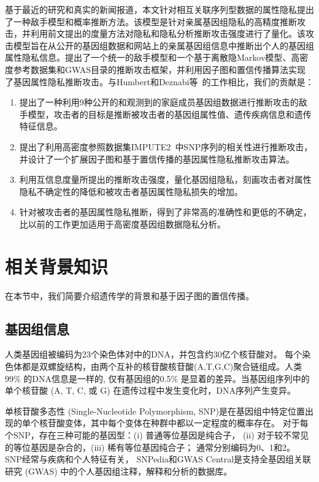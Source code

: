 基于最近的研究和真实的新闻报道，本文针对相互关联序列型数据的属性隐私提出了一种敌手模型和概率推断方法。该模型是针对亲属基因组隐私的高精度推断攻击，并利用前文提出的度量方法对隐私和隐私分析推断攻击强度进行了量化。该攻击模型旨在从公开的基因组数据和网站上的亲属基因组信息中推断出个人的基因组属性隐私信息。提出了一个统一的敌手模型和一个基于离散隐Markov模型、高密度参考数据集和GWAS目录的推断攻击框架，并利用因子图和置信传播算法实现了基因属性隐私推断攻击。与Humbert和Deznabi等~\cite{deznabi2018inference}的工作相比，我们的贡献是：

\begin{enumerate}
	\item 提出了一种利用9种公开的和观测到的家庭成员基因组数据进行推断攻击的敌手模型，攻击者的目标是推断被攻击者的基因组属性值、遗传疾病信息和遗传特征信息。
	\item 提出了利用高密度参照数据集IMPUTE2~\cite{howie2014impute2}中SNP序列的相关性进行推断攻击，并设计了一个扩展因子图和基于置信传播的基因属性隐私推断攻击算法。
	\item 利用互信息度量所提出的推断攻击强度，量化基因组隐私，刻画攻击者对属性隐私不确定性的降低和被攻击者基因属性隐私损失的增加。
	\item 针对被攻击者的基因属性隐私推断，得到了非常高的准确性和更低的不确定，比以前的工作更加适用于高密度基因组数据隐私分析。
\end{enumerate}

\section{相关背景知识}
\label{sec:backgrounds}
在本节中，我们简要介绍遗传学的背景和基于因子图的置信传播。

\subsection{基因组信息}

人类基因组被编码为23个染色体对中的DNA，并包含约30亿个核苷酸对。 每个染色体都是双螺旋结构，由两个互补的核苷酸核苷酸(A,T,G,C)聚合链组成。人类 99\% 的DNA信息是一样的, 仅有基因组的0.5\% 是显着的差异。当基因组序列中的单个核苷酸 (A, T, C, 或 G) 在遗传过程中发生变化时，DNA序列产生变异。

单核苷酸多态性 (Single-Nucleotide Polymorphism, SNP)是在基因组中特定位置出现的单个核苷酸变体，其中每个变体在种群中都以一定程度的概率存在。 对于每个SNP，存在三种可能的基因型：(i) 普通等位基因是纯合子， (ii) 对于较不常见的等位基因是杂合的，(iii) 稀有等位基因纯合子； 通常分别编码为0、1和2。 SNP经常与疾病和个人特征有关， SNPedia和GWAS Central是支持全基因组关联研究 (GWAS) 中的个人基因组注释，解释和分析的数据库。

